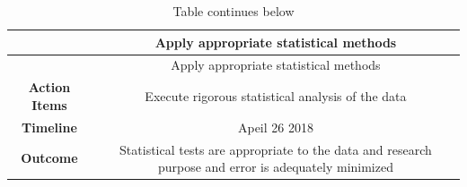 \documentclass[]{elsarticle} %
\begin{document}
\begin{longtable}[]{@{}cc@{}}
\caption{Table continues below}\tabularnewline
\toprule
\begin{minipage}[b]{0.25\columnwidth}\centering\strut
~\strut
\end{minipage} & \begin{minipage}[b]{0.41\columnwidth}\centering\strut
Apply appropriate statistical methods\strut
\end{minipage}\tabularnewline
\midrule
\endfirsthead
\toprule
\begin{minipage}[b]{0.25\columnwidth}\centering\strut
~\strut
\end{minipage} & \begin{minipage}[b]{0.41\columnwidth}\centering\strut
Apply appropriate statistical methods\strut
\end{minipage}\tabularnewline
\midrule
\endhead
\begin{minipage}[t]{0.25\columnwidth}\centering\strut
\textbf{Action Items}\strut
\end{minipage} & \begin{minipage}[t]{0.41\columnwidth}\centering\strut
Execute rigorous statistical analysis of the data\strut
\end{minipage}\tabularnewline
\begin{minipage}[t]{0.25\columnwidth}\centering\strut
\textbf{Timeline}\strut
\end{minipage} & \begin{minipage}[t]{0.41\columnwidth}\centering\strut
Apeil 26 2018\strut
\end{minipage}\tabularnewline
\begin{minipage}[t]{0.25\columnwidth}\centering\strut
\textbf{Outcome}\strut
\end{minipage} & \begin{minipage}[t]{0.41\columnwidth}\centering\strut
Statistical tests are appropriate to the data and research purpose and
error is adequately minimized\strut
\end{minipage}\tabularnewline
\bottomrule
\end{longtable}
\end{document}
